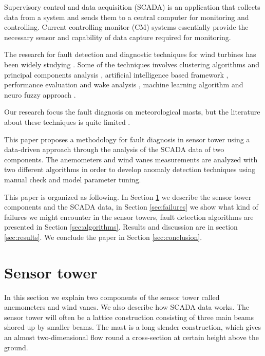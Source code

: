\documentclass[journal]{IEEEtran}
\begin{document}
Supervisory control and data acquisition (SCADA) is an application that collects data from a system and sends them to a central computer for monitoring and controlling. Current controlling monitor (CM) systems essentially provide the necessary sensor and capability of data capture required for monitoring.

The research for  fault detection and diagnostic techniques for wind turbines has been widely studying  \cite{tchakoua2014wind,wymore2015survey,lu2009review}. Some of the techniques involves
clustering algorithms and principal components analysis \cite{kim2011use}, artificial intelligence based framework \cite{wang2014scada}, performance evaluation and wake analysis \cite{astolfi2016mathematical}, machine learning algorithm \cite{kusiak2011prediction,schlechtingen2011comparative} and neuro fuzzy approach \cite{schlechtingen2012condition}.

Our research focus the fault diagnosis on meteorological masts,   
but the literature about these techniques is quite limited \cite{hasu2006weather} .

This paper proposes a methodology for fault diagnosis in sensor tower using a data-driven approach through the analysis of the SCADA data of two components. The anemometers and wind vanes measurements are analyzed with two different algorithms in order to develop anomaly detection techniques using manual check and model parameter tuning. 

This paper is organized as following. In Section \ref{sec:sensortower} we describe the sensor tower components and the SCADA data, in Section \ref{sec:failures} we show what kind of failures we might encounter in the sensor towers, fault detection algorithms are presented in Section \ref{sec:algorithms}. Results and discussion are in section \ref{sec:results}. We conclude the paper in Section \ref{sec:conclusion}.

\section{Sensor tower}\label{sec:sensortower}
In this section we explain two components of the sensor tower called anemometers and wind vanes.  We also describe how SCADA data works.
The sensor tower will often be a lattice construction consisting of three main beams shored up by smaller beams. The mast is a long slender construction, which gives an almost two-dimensional flow round a cross-section at certain height above the ground. 
\end{document}
